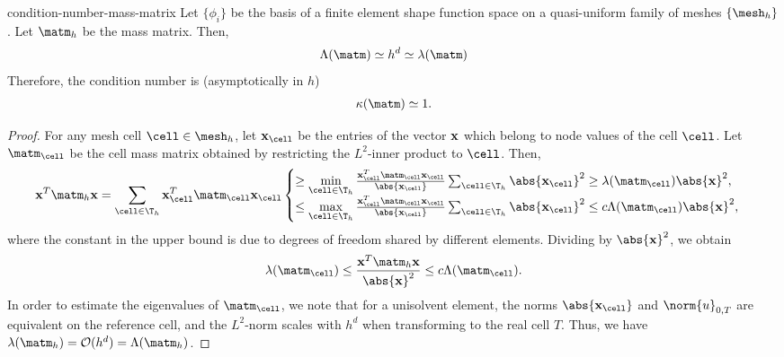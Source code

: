 \begin{Lemma}{condition-number-mass-matrix}
  Let $\{\phi_i\}$ be the basis of a finite element shape function
  space on a quasi-uniform family of meshes $\{\mesh_h\}$. Let
  $\matm_h$ be the mass matrix. Then,
  \begin{gather*}
    \Lambda(\matm) \simeq h^{d} \simeq  \lambda(\matm)
  \end{gather*}
  Therefore, the condition number is (asymptotically in $h$)
  \begin{gather*}
    \kappa(\matm) \simeq 1.
  \end{gather*}
\end{Lemma}

\begin{proof}
  For any mesh cell
  $\cell\in\mesh_h$, let $\vecx_{\cell}$ be the entries of the vector $\mathbf x$ which
  belong to node values of the cell $\cell$. Let $\matm_\cell$ be the cell
  mass matrix obtained by restricting the $L^2$-inner product to
  $\cell$. Then,
  \begin{gather*}
    \vecx^T \matm_h \vecx
    = \sum_{\cell\in\T_h} \vecx^T_{\cell} \matm_{\cell} \vecx_{\cell}
    \begin{cases}
    \ge \min\limits_{\cell\in\T_h} \frac{\vecx^T_{\cell} \matm_{\cell} \vecx_{\cell}}{\abs{\vecx_{\cell}}} \sum_{\cell\in\T_h} \abs{\vecx_{\cell}}^2 \ge \lambda(\matm_{\cell}) \abs{\vecx}^2,\\
    \le \max\limits_{\cell\in\T_h} \frac{\vecx^T_{\cell} \matm_{\cell} \vecx_{\cell}}{\abs{\vecx_{\cell}}} \sum_{\cell\in\T_h} \abs{\vecx_{\cell}}^2 \le c \Lambda(\matm_{\cell}) \abs{\vecx}^2,
    \end{cases}
  \end{gather*}
  where the constant in the upper bound is due to degrees of freedom
  shared by different elements. Dividing by $\abs{\vecx}^2$, we
  obtain
  \begin{gather}
    \lambda(\matm_\cell) \le \frac{\vecx^T \matm_h \vecx}{\abs{\vecx}^2} \le c \Lambda(\matm_\cell).
  \end{gather}
  In order to estimate the eigenvalues of $\matm_{\cell}$, we note that for
  a unisolvent element, the norms $\abs{\vecx_{\cell}}$ and $\norm{u}_{0,T}$ are
  equivalent on the reference cell, and the $L^2$-norm scales with
  $h^d$ when transforming to the real cell $T$. Thus, we have
  $\lambda(\matm_h) = \mathcal O(h^{d}) = \Lambda(\matm_h)$.
\end{proof}

